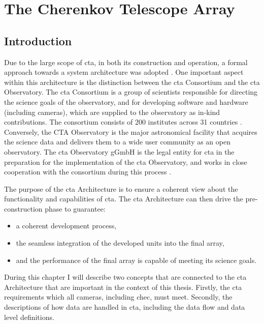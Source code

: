 \chapter{\label{ch3-architecture}The Cherenkov Telescope Array} 

\minitoc

\section{Introduction}

Due to the large scope of \gls{cta}, in both its construction and operation, a formal approach towards a system architecture was adopted \cite{Dazzi2018}. One important aspect within this architecture is the distinction between the \gls{cta} Consortium and the \gls{cta} Observatory. The \gls{cta} Consortium is a group of scientists responsible for directing the science goals of the observatory, and for developing software and hardware (including cameras), which are supplied to the observatory as in-kind contributions. The consortium consists of 200 institutes across 31 countries \cite{cta-consortium}. Conversely, the CTA Observatory is the major astronomical facility that acquires the science data and delivers them to a wide user community as an open observatory. The \gls{cta} Observatory gGmbH is the legal entity for \gls{cta} in the preparation for the implementation of the \gls{cta} Observatory, and works in close cooperation with the consortium during this process \cite{cta-observatory}.

The purpose of the \gls{cta} Architecture is to ensure a coherent view about the functionality and capabilities of \gls{cta}. The \gls{cta} Architecture can then drive the pre-construction phase to guarantee:
\begin{itemize}
\item a coherent development process,
\item the seamless integration of the developed units into the final array,
\item and the performance of the final array is capable of meeting its science goals.
\end{itemize}
During this chapter I will describe two concepts that are connected to the \gls{cta} Architecture that are important in the context of this thesis. Firstly, the \gls{cta} requirements which all cameras, including \gls{chec}, must meet. Secondly, the descriptions of how data are handled in \gls{cta}, including the data flow and data level definitions.

